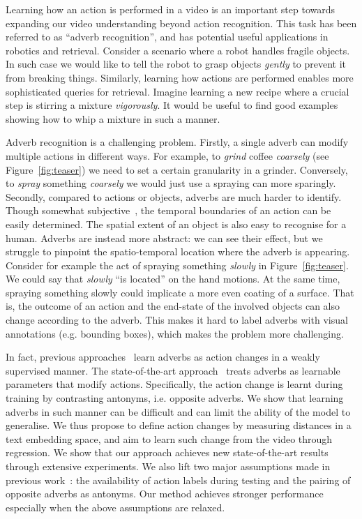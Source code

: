 \documentclass[10pt,twocolumn,letterpaper]{article}
\begin{document}
Learning  
how an action is performed in a video is an important step towards expanding our video understanding beyond 
action recognition.  
This task has been referred to as ``adverb recognition'', and 
has potential useful applications in robotics and retrieval. Consider a scenario where a robot 
handles fragile objects. In such case we would like to tell the robot to grasp objects \textit{gently} 
to prevent it from breaking things. Similarly, learning how actions are performed enables more sophisticated queries for 
retrieval. Imagine 
learning a new recipe where a crucial step is stirring a mixture \textit{vigorously}. 
It would be useful to find good examples showing how to whip a mixture in such a manner. 

Adverb recognition is a challenging problem. Firstly, a single adverb can modify multiple actions in different ways. For example, 
to \textit{grind} coffee \textit{coarsely} (see Figure~\ref{fig:teaser}) we need to set a certain granularity in a grinder. Conversely, to \textit{spray} something \textit{coarsely} we would just use a spraying can more sparingly. 
Secondly, compared to actions or objects, adverbs are much harder to identify. 
Though somewhat subjective~\cite{moltisanti2017trespassing,alwassel2018diagnosing}, the temporal boundaries of an action can be easily determined. The spatial extent of an object is also easy to recognise for a human. 
Adverbs are instead more abstract: 
we can see their effect, but we struggle to pinpoint 
the spatio-temporal location where the adverb is appearing. 
Consider for example the act of spraying something \textit{slowly} 
in Figure~\ref{fig:teaser}. 
We could say that \textit{slowly} ``is located'' on the 
hand motions. At the same time, spraying something slowly could implicate a more even coating of a surface.
That is, the outcome of an action and the end-state of the involved objects can also change according to the adverb. 
This makes it hard to label adverbs with visual annotations (e.g. bounding boxes), 
which makes the problem more challenging. 

In fact, previous approaches~\cite{doughty2020action, doughty2022you} learn adverbs as action changes in a weakly supervised manner. The state-of-the-art approach~\cite{doughty2020action} treats adverbs as learnable parameters that modify actions. Specifically, 
the action change is learnt during training by contrasting antonyms, i.e. opposite adverbs.
We show that learning adverbs in such manner 
can be difficult and can limit the ability of the model to generalise.
We thus propose to define action changes by measuring distances in a text embedding space, and aim to learn such change from the video through regression. We show that 
our approach achieves new state-of-the-art results through extensive experiments. We also lift two major assumptions made in previous work~\cite{doughty2020action, doughty2022you}: the availability of action labels during testing and the pairing of opposite adverbs as antonyms. 
Our method achieves stronger performance especially when the above assumptions are relaxed. 
\end{document}
